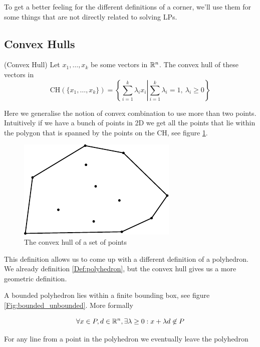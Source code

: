 To get a better feeling for the different definitions of a corner, we'll use them for some things that are not directly related to solving LPs.

\subsection*{Convex Hulls}
\begin{Def}(Convex Hull) Let $x_1,\ldots,x_k$ be some vectors in $\mathbb{R}^n$. The convex hull of these vectors in
\[\mbox{CH}(\{x_1,\ldots,x_k\}) = \left\{\sum _{i=1}^k \lambda_i x_i \left| \sum_{i=1}^k \lambda_i =1,\ \lambda_i\geq 0\right.\right\}\]
\end{Def}

Here we generalise the notion of convex combination to use more than two points. Intuitively if we have a bunch of points in 2D we get all the points that lie within the polygon that is spanned by the points on the CH, see figure \ref{Fig:convexHull}.

\begin{figure}[hbt]
\begin{center}
\includegraphics{./images/convex_hull.pdf}
\end{center}
\caption{The convex hull of a set of points}
\label{Fig:convexHull}
\end{figure}

This definition allows us to come up with a different definition of a polyhedron. We already definition \ref{Def:polyhedron}, but the convex hull gives us a more geometric definition.

\begin{Def} A bounded polyhedron lies within a finite bounding box, see figure \ref{Fig:bounded_unbounded}. More formally

\[\forall x\in P,d\in \mathbb{R}^n, \exists \lambda\geq 0: x+\lambda d \not \in P\]

For any line from a point in the polyhedron we eventually leave the polyhedron
\end{Def}

